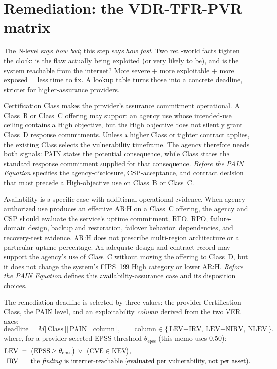 \documentclass[11pt]{article}
\newcommand{\ceilingpaper}{\href{https://stackarmor.github.io/rfc-fedramp-vdr/vdr-pain-security-requirements.pdf}{\emph{Before the PAIN Equation}}}
\begin{document}
\section{Remediation: the VDR-TFR-PVR matrix}
\label{sec:remediation}
\begin{plain}
The N-level says \emph{how bad}; this step says \emph{how fast}. Two real-world facts
tighten the clock: is the flaw actually being exploited (or very likely to be), and
is the system reachable from the internet? More severe + more exploitable + more
exposed = less time to fix. A lookup table turns those into a concrete deadline,
stricter for higher-assurance providers.
\end{plain}

Certification Class makes the provider's assurance commitment operational. A
Class~B or Class~C offering may support an agency use whose intended-use ceiling
contains a High objective, but the High objective does not silently grant
Class~D response commitments. Unless a higher Class or tighter contract applies,
the existing Class selects the vulnerability timeframe. The agency therefore
needs both signals: PAIN states the potential consequence, while Class states the
standard response commitment supplied for that consequence. \ceilingpaper{}
specifies the agency-disclosure, CSP-acceptance, and contract decision that must
precede a High-objective use on Class~B or Class~C.

Availability is a specific case with additional operational evidence. When
agency-authorized use produces an effective AR:H on a Class~C offering, the agency
and CSP should evaluate the service's uptime commitment, RTO, RPO, failure-domain
design, backup and restoration, failover behavior, dependencies, and recovery-test
evidence. AR:H does not prescribe multi-region architecture or a particular uptime
percentage. An adequate design and contract record may support the agency's use of
Class~C without moving the offering to Class~D, but it does not change the system's
FIPS~199 High category or lower AR:H. \ceilingpaper{} defines this
availability-assurance case and its disposition choices.

The remediation deadline is selected by three values: the provider Certification
Class, the PAIN level, and an exploitability \emph{column} derived from the two VER
axes:
\[
\text{deadline} = M\big[\,\text{Class}\,\big]\big[\,\text{PAIN}\,\big]\big[\,\text{column}\,\big],
\qquad
\text{column} \in \{\,\text{LEV+IRV},\ \text{LEV+NIRV},\ \text{NLEV}\,\}.
\]
where, for a provider-selected EPSS threshold $\theta_{\text{epss}}$ (this memo uses
$0.50$):
\begin{align*}
\text{LEV} \;&=\; \big(\text{EPSS} \ge \theta_{\text{epss}}\big)\ \lor\ \big(\text{CVE} \in \text{KEV}\big),\\
\text{IRV} \;&=\; \text{the \emph{finding} is internet-reachable (evaluated per vulnerability, not per asset).}
\end{align*}
\end{document}
